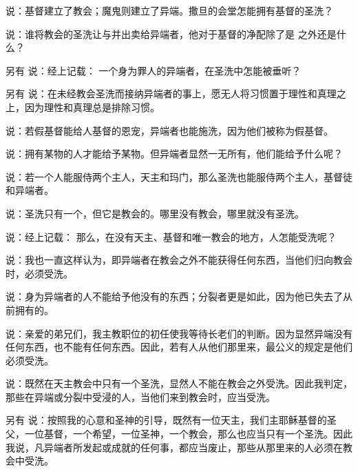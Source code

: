 说：基督建立了教会；魔鬼则建立了异端。撒旦的会堂怎能拥有基督的圣洗？\par

 说：谁将教会的圣洗让与并出卖给异端者，他对于基督的净配除了是 之外还是什么？\par

另有 说：经上记载： 一个身为罪人的异端者，在圣洗中怎能被垂听？\par

另有 说：在未经教会圣洗而接纳异端者的事上，愿无人将习惯置于理性和真理之上，因为理性和真理总是排除习惯。\par

 说：若假基督能给人基督的恩宠，异端者也能施洗，因为他们被称为假基督。\par

 说：拥有某物的人才能给予某物。但异端者显然一无所有，他们能给予什么呢？\par

 说：若一个人能服侍两个主人，天主和玛门，那么圣洗也能服侍两个主人，基督徒和异端者。\par

 说：圣洗只有一个，但它是教会的。哪里没有教会，哪里就没有圣洗。\par

 说：经上记载： 那么，在没有天主、基督和唯一教会的地方，人怎能受洗呢？\par

 说：我也一直这样认为，即异端者在教会之外不能获得任何东西，当他们归向教会时，必须受洗。\par

 说：身为异端者的人不能给予他没有的东西；分裂者更是如此，因为他已失去了从前拥有的。\par

 说：亲爱的弟兄们，我主教职位的初任使我等待长老们的判断。因为显然异端没有任何东西，也不能有任何东西。因此，若有人从他们那里来，最公义的规定是他们必须受洗。\par

 说：既然在天主教会中只有一个圣洗，显然人不能在教会之外受洗。因此我判定，那些在异端或分裂中受浸的人，当他们来到教会时，应当受洗。\par

另有 说：按照我的心意和圣神的引导，既然有一位天主，我们主耶稣基督的圣父，一位基督，一个希望，一位圣神，一个教会，那么也应当只有一个圣洗。因此我说，凡异端者所发起或成就的任何事，都应当废止，那些从那里来的人必须在教会中受洗。\par

